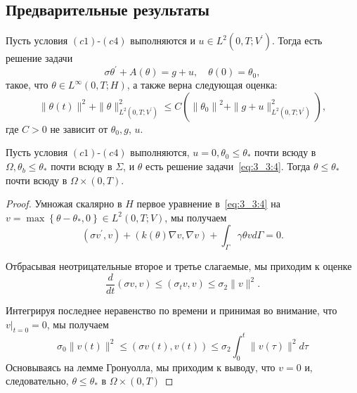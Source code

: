 \subsection{Предварительные результаты}
\label{subsec:ch3:sec3:subsec3}

\begin{lemma}
    \label{lm:3_3:1}
    Пусть условия $(c1)$-$(c4)$ выполняются и $u \in L^{2}\left(0, T ; V^{\prime}\right)$.
    Тогда есть решение задачи
    \begin{equation}
        \label{eq:3_3:4}
        \sigma \theta^{\prime}+A(\theta)=g+u, \quad \theta(0)=\theta_{0},
    \end{equation}
    такое, что $\theta \in L^{\infty}(0, T ; H)$, а также верна следующая оценка:
    \[
        \|\theta(t)\|^{2}+\|\theta\|_{L^{2}\left(0, T ; V^{\prime}\right)}^{2}
        \leq C\left(\left\|\theta_{0}\right\|^{2}+\|g+u\|_{L^{2}
        \left(0, T; V^{\prime}\right)}^{2}\right),
    \]
    где $C>0$ не зависит от $\theta_{0}, g$, $u$.
\end{lemma}

\begin{lemma}
    \label{lm:3_3:2}
    Пусть условия $(c1)$-$(c4)$ выполняются, $u=0, \theta_{0} \leq \theta_{*}$ почти всюду
    в $\Omega, \theta_{b} \leq \theta_{*}$ почти всюду в $\Sigma$, и $\theta$ есть
    решение задачи~\eqref{eq:3_3:4}.
    Тогда $\theta \leq \theta_{*}$ почти всюду в $\Omega \times(0, T)$.
\end{lemma}

\begin{proof}
    Умножая скалярно в $H$ первое уравнение в~\eqref{eq:3_3:4} на
    $v=\max \left\{\theta-\theta_{*}, 0\right\}\in L^{2}(0, T; V)$, мы получаем
    \[
        \left(\sigma v^{\prime}, v\right)+(k(\theta) \nabla v, \nabla v)
        + \int_{\Gamma} \gamma \theta v d \Gamma=0.
    \]

    Отбрасывая неотрицательные второе и третье слагаемые, мы приходим к оценке
    \[
        \frac{d}{d t}(\sigma v, v) \leq\left(\sigma_{t} v, v\right) \leq \sigma_{2}\|v\|^{2}.
    \]

    Интегрируя последнее неравенство по времени и принимая во внимание,
    что $\left.v\right|_{t=0}=0$, мы получаем
    \[
        \sigma_{0}\|v(t)\|^{2} \leq(\sigma v(t), v(t))
        \leq \sigma_{2} \int_{0}^{t}\|v(\tau)\|^{2} d \tau
    \]
    Основываясь на лемме Гронуолла, мы приходим к выводу, что $v=0$ и, следовательно,
    $\theta \leq \theta_{*}$ в $\Omega \times(0, T)$
\end{proof}

